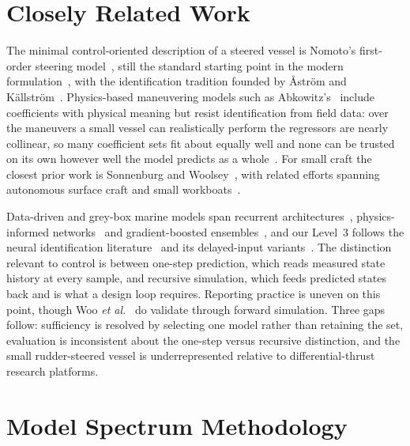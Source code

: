 \documentclass[conference]{IEEEtran}
\begin{document}
\section{Closely Related Work}
\label{sec:related}

The minimal control-oriented description of a steered vessel is Nomoto's first-order steering model~\cite{nomoto1957steering}, still the standard starting point in the modern formulation~\cite{fossen2011handbook}, with the identification tradition founded by {\AA}str{\"o}m and K{\"a}llstr{\"o}m~\cite{astrom1976identification}. Physics-based maneuvering models such as Abkowitz's~\cite{abkowitz1964lectures} include coefficients with physical meaning but resist identification from field data: over the maneuvers a small vessel can realistically perform the regressors are nearly collinear, so many coefficient sets fit about equally well and none can be trusted on its own however well the model predicts as a whole~\cite{suarez2026regularized,alexandersson2022system,xu2025review}. For small craft the closest prior work is Sonnenburg and Woolsey~\cite{sonnenburg2013modeling,sonnenburg2010control}, with related efforts spanning autonomous surface craft and small workboats~\cite{eriksen2017modeling,muske2008identification,wirtensohn2013modelling,morel2025practical,sarda2016nmpc}.

Data-driven and grey-box marine models span recurrent architectures~\cite{woo2018dynamic}, physics-informed networks~\cite{xu2022pinn} and gradient-boosted ensembles~\cite{zhang2024gbm}, and our Level~3 follows the neural identification literature~\cite{narendra1990identification} and its delayed-input variants~\cite{lin1997delay}. The distinction relevant to control is between one-step prediction, which reads measured state history at every sample, and recursive simulation, which feeds predicted states back and is what a design loop requires. Reporting practice is uneven on this point, though Woo \emph{et al.}~\cite{woo2018dynamic} do validate through forward simulation. Three gaps follow: sufficiency is resolved by selecting one model rather than retaining the set, evaluation is inconsistent about the one-step versus recursive distinction, and the small rudder-steered vessel is underrepresented relative to differential-thrust research platforms.

\section{Model Spectrum Methodology}
\label{sec:methodology}
\end{document}
